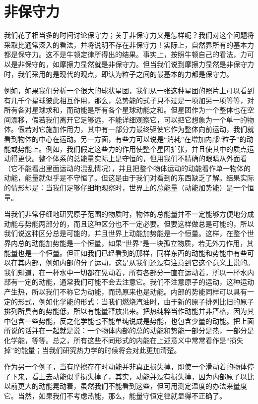 \documentclass[12pt,oneside]{book}
\begin{document}
\section{非保守力}
我们花了相当多的时间讨论保守力；关于非保守力又是怎样呢？我们对这个问题将采取比通常深入的看法，并将说明不存在非保守力！实际上，自然界所有的基本力都是保守力。这不是牛顿定律所得出的结果。事实上，按照牛顿自己的看法，力可以是非保守的，如摩擦力显然就是非保守力。但当我们说到摩擦力显然是非保守力时，我们采用的是现代的观点，即认为粒子之间的最基本的力都是保守力。

例如，如果我们分析一个很大的球状星团，我们从一张这种星团的照片上可以看到有几千个星球彼此相互作用，那么，总势能的式子只不过是一项加另一项等等，对所有各对星球求和，而动能是所有各个星球动能之和。但星团作为一个整体也在空间漂移，假若我们离开它足够远，不能详细观察它，可以把它想象为一个单一的物体。假若对它施加作用力，其中有一部分力最终驱使它作为整体向前运动，我们就看到物体的中心在运动。另一方面，有些力可以说是“消耗”在增加内部“粒子”的动能或势能上。例如，我们假定这些力的作用使整个星团扩张，并且使其中的质点运动得更快。整个体系的总能量实际上是守恒的，但用我们不精确的眼睛从外面看（它不能看出里面运动的混乱情况），并且把整个物体运动的动能看作单一物体的动能，能量就似乎是不守恒了。但这是由于我们对看到的东西缺乏了解。结果实际的情形却是：当我们足够仔细地观察时，世界上的总能量（动能加势能）是一个恒量。

当我们非常仔细地研究原子范围的物质时，物体的总能量并不一定能够方便地分成动能与势能两部分的，而且这种区分也不一定必要。但要这样做总是可能的，所以我们说这种区分总是可能的，并且世界上动能加势能是一个恒量。这样，在整个世界内总的动能加势能是一个恒量，如果“世界”是一块孤立物质，若无外力作用，其能量也是一个恒量。但正如我们已经看到的那样，同样东西的动能和势能中有些可以在其内部，例如内部的分子运动，这是从我们还没有注意到它这个意义上说的。我们知道，在一杯水中一切都在晃动着，所有各部分一直在运动着，所以一杯水内部有一定的动能，通常我们可能不会去注意它。我们不注意原子的运动，这种运动产生热，所以我们不称它为动能，而热原来也是动能。内部的势能同样可以具有一定的形式，例如化学能的形式：当我们燃烧汽油时，由于新的原子排列比旧的原子排列所具有的势能低，所以有能量释放出来。把热纯粹当作动能并非严格，因为其中包含一些势能，反之化学能也不能单纯说成是势能，也包含少量的动能。把上面所说的话并在一起就是说：一个物体内部的总的动能和势能一部分是热，一部分是化学能，等等。总之，所有这些不同形式的内能在上述意义中常常看作是“损失掉”的能量；当我们研究热力学的时候将会对此更加清楚。

作为另一个例子，当有摩擦存在时动能并非真正损失掉，即使一个滑动着的物体停了下来，看上去动能似乎损失掉了，其实，动能并没有损失掉，因为内部原子以比以前更大的动能晃动着，虽然我们不能看到这些，但可用测定温度的办法来量度它。当然，如果我们不考虑热能，那么，能量守恒定律就显得不正确了。
\end{document}
